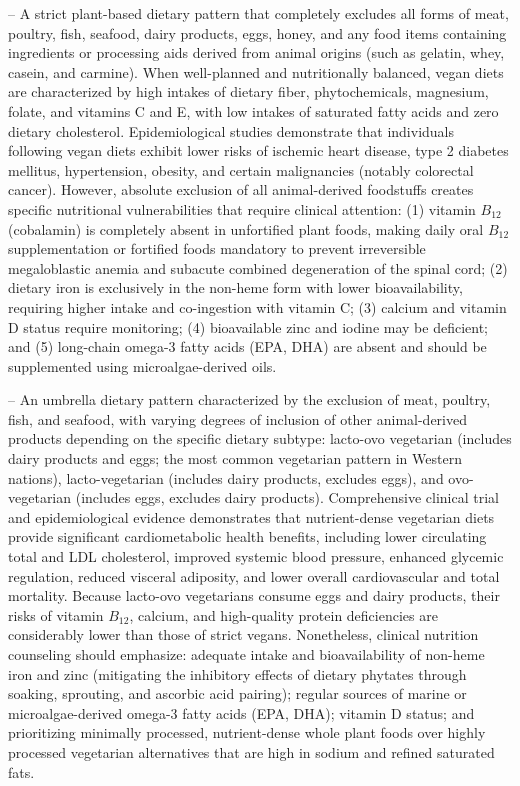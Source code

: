 -- A strict plant-based dietary pattern that completely excludes all forms of meat, poultry, fish, seafood, dairy products, eggs, honey, and any food items containing ingredients or processing aids derived from animal origins (such as gelatin, whey, casein, and carmine). When well-planned and nutritionally balanced, vegan diets are characterized by high intakes of dietary fiber, phytochemicals, magnesium, folate, and vitamins C and E, with low intakes of saturated fatty acids and zero dietary cholesterol. Epidemiological studies demonstrate that individuals following vegan diets exhibit lower risks of ischemic heart disease, type 2 diabetes mellitus, hypertension, obesity, and certain malignancies (notably colorectal cancer). However, absolute exclusion of all animal-derived foodstuffs creates specific nutritional vulnerabilities that require clinical attention: (1) vitamin $B_{12}$ (cobalamin) is completely absent in unfortified plant foods, making daily oral $B_{12}$ supplementation or fortified foods mandatory to prevent irreversible megaloblastic anemia and subacute combined degeneration of the spinal cord; (2) dietary iron is exclusively in the non-heme form with lower bioavailability, requiring higher intake and co-ingestion with vitamin C; (3) calcium and vitamin D status require monitoring; (4) bioavailable zinc and iodine may be deficient; and (5) long-chain omega-3 fatty acids (EPA, DHA) are absent and should be supplemented using microalgae-derived oils.

-- An umbrella dietary pattern characterized by the exclusion of meat, poultry, fish, and seafood, with varying degrees of inclusion of other animal-derived products depending on the specific dietary subtype: lacto-ovo vegetarian (includes dairy products and eggs; the most common vegetarian pattern in Western nations), lacto-vegetarian (includes dairy products, excludes eggs), and ovo-vegetarian (includes eggs, excludes dairy products). Comprehensive clinical trial and epidemiological evidence demonstrates that nutrient-dense vegetarian diets provide significant cardiometabolic health benefits, including lower circulating total and LDL cholesterol, improved systemic blood pressure, enhanced glycemic regulation, reduced visceral adiposity, and lower overall cardiovascular and total mortality. Because lacto-ovo vegetarians consume eggs and dairy products, their risks of vitamin $B_{12}$, calcium, and high-quality protein deficiencies are considerably lower than those of strict vegans. Nonetheless, clinical nutrition counseling should emphasize: adequate intake and bioavailability of non-heme iron and zinc (mitigating the inhibitory effects of dietary phytates through soaking, sprouting, and ascorbic acid pairing); regular sources of marine or microalgae-derived omega-3 fatty acids (EPA, DHA); vitamin D status; and prioritizing minimally processed, nutrient-dense whole plant foods over highly processed vegetarian alternatives that are high in sodium and refined saturated fats.


